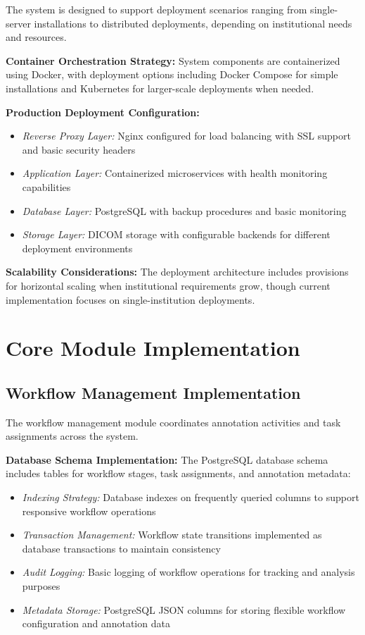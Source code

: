 The system is designed to support deployment scenarios ranging from single-server installations to distributed deployments, depending on institutional needs and resources.

\textbf{Container Orchestration Strategy:} System components are containerized using Docker, with deployment options including Docker Compose for simple installations and Kubernetes for larger-scale deployments when needed.

\textbf{Production Deployment Configuration:}
\begin{itemize}
    \item \textit{Reverse Proxy Layer:} Nginx configured for load balancing with SSL support and basic security headers
    \item \textit{Application Layer:} Containerized microservices with health monitoring capabilities
    \item \textit{Database Layer:} PostgreSQL with backup procedures and basic monitoring
    \item \textit{Storage Layer:} DICOM storage with configurable backends for different deployment environments
\end{itemize}

\textbf{Scalability Considerations:} The deployment architecture includes provisions for horizontal scaling when institutional requirements grow, though current implementation focuses on single-institution deployments.

\section{Core Module Implementation}

\subsection{Workflow Management Implementation}

The workflow management module coordinates annotation activities and task assignments across the system.

\textbf{Database Schema Implementation:} The PostgreSQL database schema includes tables for workflow stages, task assignments, and annotation metadata:

\begin{itemize}
    \item \textit{Indexing Strategy:} Database indexes on frequently queried columns to support responsive workflow operations
    \item \textit{Transaction Management:} Workflow state transitions implemented as database transactions to maintain consistency
    \item \textit{Audit Logging:} Basic logging of workflow operations for tracking and analysis purposes
    \item \textit{Metadata Storage:} PostgreSQL JSON columns for storing flexible workflow configuration and annotation data
\end{itemize}

